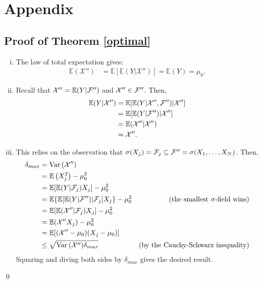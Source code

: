 \documentclass[11pt]{article}
\newcommand{\E}{\mathbb{E}}
\theoremstyle{definition}
\theoremstyle{definition}
\def\F{{\cal F}}
\def\E{{\mathbb E}}
\def\Var{{\rm Var}\,}
\begin{document}
\appendix
\section{Appendix}
\subsection{Proof of Theorem \ref{optimal}}
\begin{enumerate}[i)]
\item The law of total expectation gives:
\begin{align*}
\E(\mathcal{X}'') &= \E[\E(Y|\mathcal{X}'')] =  \E(Y) = \mu_0.
\end{align*}

\item Recall that $ \mathcal{X}'' = \E(Y | \F'')$ and $\mathcal{X}'' \in \F''$. Then,
\begin{align*}
\E(Y | \mathcal{X}'') &= \E[\E(Y|\mathcal{X}'',\F'')|\mathcal{X}'']\\
&= \E[\E(Y|\F'')|\mathcal{X}'']\\
&= \E(\mathcal{X}''|\mathcal{X}'') \\
&= \mathcal{X}''.
\end{align*}

\item This relies on the observation that $\sigma(X_j) = \F_j \subseteq \F'' = \sigma(X_1, \dots, X_N)$. Then,
\begin{align*}
\delta_{max} &=\Var(\mathcal{X}'')\\
 &= \E\left(X_j^2\right) - \mu_0^2\\
 &= \E[\E(Y|\F_j)X_j] - \mu_0^2\\
 &= \E\{\E[\E(Y|\F'')|\F_j]X_j\} - \mu_0^2 & \text{(the smallest $\sigma$-field wins)}\\
 &= \E[\E(\mathcal{X}''|\F_j)X_j] - \mu_0^2 \\
 &= \E(\mathcal{X}''X_j) - \mu_0^2 \\
 &= \E[(\mathcal{X}''-\mu_0)(X_j-\mu_0)]  \\
 &\leq \sqrt{\Var(\mathcal{X}'')\delta_{max} } & \text{(by the Cauchy-Schwarz inequality)} 
\end{align*}
Squaring and diving both sides by $\delta_{max} $ gives the desired result. 

\end{enumerate}
\qed
\end{document}
